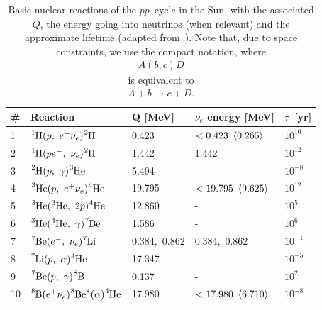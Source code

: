 \bgroup
\def\arraystretch{1.25}
\begin{table}[!htbp]
  \begin{tabular}{lllll}
    \hline
    \# & Reaction & Q [MeV] & $\nu_e$ energy [MeV] & $\tau$~[yr]\\
    \hline
    \hline
    1 & $\ce{^1H} (p,~e^+ \nu_e) \ce{^2H}$ & 0.423 & $< 0.423~\left<0.265\right>$ & $10^{10}$\\
    2 & $\ce{^1H} (pe^-,~\nu_e) \ce{^2H}$ & 1.442 & 1.442 & $10^{12}$\\
    3 & $\ce{^2H} (p,~\gamma) \ce{^3He}$ & 5.494 & - & $10^{-8}$\\
    4 & $\ce{^3He} (p,~e^+ \nu_e) \ce{^4He}$ & 19.795 & $< 19.795~\left<9.625\right>$ & $10^{12}$\\
    5 & $\ce{^3He} (\ce{^3He},~2p) \ce{^4He}$ & 12.860 & - & $10^{5}$\\
    6 & $\ce{^3He} (\ce{^4He},~\gamma) \ce{^7Be}$ & 1.586 & - & $10^{6}$\\
    7 & $\ce{^7Be} (e^-,~\nu_e) \ce{^7Li}$ & 0.384,~0.862 & 0.384,~0.862 & $10^{-1}$\\
    8 & $\ce{^7Li} (p,~\alpha) \ce{^4He}$ & 17.347 & - & $10^{-5}$\\
    9 & $\ce{^7Be} (p,~\gamma) \ce{^8B}$ & 0.137 & - & $10^{2}$\\
    10 & $\ce{^8B} (e^+ \nu_e) \ce{^8Be}^* (\alpha) \ce{^4He}$ & 17.980 & $< 17.980~\left<6.710\right>$ & $10^{-8}$\\
    \hline
  \end{tabular}
  \caption{Basic nuclear reactions of the $pp$~cycle in the Sun, with the associated
  $Q$, the energy going into neutrinos (when relevant) and the approximate lifetime
  (adapted from~\cite{1988RvMP...60..297B}). Note that, due to space constraints,
  we use the compact notation, where
  \begin{align*}
    A (b, c) D
  \end{align*}
  is equivalent to
  \begin{align*}
    A + b \rightarrow c + D.
  \end{align*}}
  \label{tab:pp_cycle}
\end{table}
\egroup


